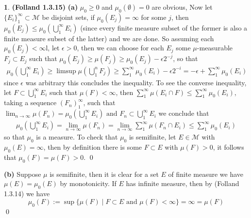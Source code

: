 \documentclass[10.5pt]{article}
\theoremstyle{definition}
\newtheorem{pb}{}
\newcommand{\set}[1]{\{#1\}}
\newcommand{\tand}{\text{ and }}
\begin{document}
    \begin{pb}\textbf{(Folland 1.3.15)}
        \textbf{(a)} \(\mu_0 \geq 0\) and \(\mu_0(\emptyset) = 0\) are obvious, Now let \(\set{E_i}_1^\infty \subset \mathcal{M}\) be disjoint sets, if \(\mu_0(E_j) = \infty\) for some \(j\), then \(\mu_0(E_j) \leq \mu_0(\bigcup_1^\infty E_i)\) (since every finite measure subset of the former is also a finite measure subset of the latter) and we are done. So assuming each \(\mu_0(E_j) < \infty\)l, let \(\epsilon > 0\), then we can choose for each \(E_j\) some \(\mu\)-measurable \(F_j \subset E_j\) such that \(\mu_0(E_j) \geq \mu(F_j) \geq \mu_0(E_j) - \epsilon2^{-j}\), so that
        \begin{align*}
            \mu_0(\bigcup_1^\infty E_i) \geq \limsup \mu(\bigcup_1^n F_j) \geq \sum_1^\infty \mu_0(E_i) - \epsilon2^{-i} = -\epsilon + \sum_1^\infty \mu_0(E_i)
        \end{align*}
        since \(\epsilon\) was arbitrary this concludes the inequality. To see the converse inequality, let \(F \subset \bigcup_1^\infty E_i\) such that \(\mu(F) < \infty\), then \(\sum_1^\infty \mu(E_i \cap F) \leq \sum_1^\infty \mu_0(E_i)\), taking a sequence \((F_n)_1^\infty\), such that \(\lim_{n\to\infty}\mu(F_n) = \mu_0(\bigcup_1^\infty E_i) \tand F_n \subset \bigcup_1^\infty E_i\) we conclude that
        \begin{align*}
            \mu_0(\bigcup_1^\infty E_i) = \lim_{n\to\infty}\mu(F_n) = \lim_{n\to\infty}\sum_1^\infty \mu(F_n \cap E_i) \leq \sum_1^\infty \mu_0(E_i)
        \end{align*} so that \(\mu_0\) is a measure. To check that \(\mu_0\) is semifinite, let \(E \in \mathcal{M}\) with \(\mu_0(E) = \infty\), then by definition there is some \(F \subset E\) with \(\mu(F) > 0\), it follows that \(\mu_0(F) = \mu(F) > 0\). \qed

        \textbf{(b)} Suppose \(\mu\) is semifinite, then it is clear for a set \(E\) of finite measure we have \(\mu(E) = \mu_0(E)\) by monotonicity. If \(E\) has infinite measure, then by (Folland 1.3.14) we have \[\mu_0(F) := \sup\set{\mu(F) \mid F \subset E \tand \mu(F) < \infty} = \infty = \mu(F)\]
        \qed


\end{pb}
\end{document}
